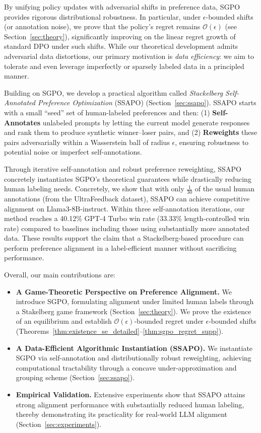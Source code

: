 By unifying policy updates with adversarial shifts in preference data, SGPO provides rigorous distributional robustness. In particular, under $\epsilon$-bounded shifts (or annotation noise), we prove that the policy’s regret remains $\mathcal{O}(\epsilon)$ (see Section~\ref{sec:theory}), significantly improving on the linear regret growth of standard DPO under such shifts. While our theoretical development admits adversarial data distortions, our primary motivation is \emph{data efficiency}: we aim to tolerate and even leverage imperfectly or sparsely labeled data in a principled manner.

Building on SGPO, we develop a practical algorithm called \emph{Stackelberg Self-Annotated Preference Optimization} (SSAPO) (Section~\ref{sec:ssapo}). SSAPO starts with a small “seed” set of human-labeled preferences and then: (1) \textbf{Self-Annotates} unlabeled prompts by letting the current model generate responses and rank them to produce synthetic winner--loser pairs, and (2) \textbf{Reweights} these pairs adversarially within a Wasserstein ball of radius $\epsilon$, ensuring robustness to potential noise or imperfect self-annotations.

Through iterative self-annotation and robust preference reweighting, SSAPO concretely instantiates SGPO’s theoretical guarantees while drastically reducing human labeling needs. Concretely, we show that with only $\tfrac{1}{30}$ of the usual human annotations (from the UltraFeedback dataset), SSAPO can achieve competitive alignment on Llama3-8B-instruct. Within three self-annotation iterations, our method reaches a 40.12\% GPT-4 Turbo win rate (33.33\% length-controlled win rate) compared to baselines including those using substantially more annotated data. These results support the claim that a Stackelberg-based procedure can perform preference alignment in a label-efficient manner without sacrificing performance.

Overall, our main contributions are:
\begin{itemize}
    \item \textbf{A Game-Theoretic Perspective on Preference Alignment.}   We introduce SGPO, formulating alignment under limited human labels through a Stakelberg game framework (Section~\ref{sec:theory}). We prove the existence of an equilibrium and establish $\mathcal{O}(\epsilon)$-bounded regret under $\epsilon$-bounded shifts (Theorems~\ref{thm:existence_se_detailed}--\ref{thm:sgpo_regret_supp}).
    \item \textbf{A Data-Efficient Algorithmic Instantiation (SSAPO).}  
          We instantiate SGPO via self-annotation and distributionally robust reweighting, achieving computational tractability through a concave under-approximation and grouping scheme (Section~\ref{sec:ssapo}).
    \item \textbf{Empirical Validation.}  
          Extensive experiments show that SSAPO attains strong alignment performance with substantially reduced human labeling, thereby demonstrating its practicality for real-world LLM alignment (Section~\ref{sec:experiments}).
\end{itemize}

